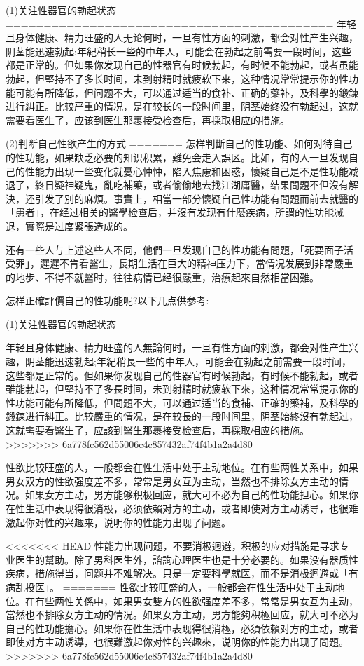 \documentclass[12pt,UTF8]{ctexbook}
\begin{document}
(1)关注性器官的勃起状态
===========================================
年轻且身体健康、精力旺盛的人无论何时，一旦有性方面的刺激，都会对性产生兴趣，阴茎能迅速勃起;年紀稍长一些的中年人，可能会在勃起之前需要一段时间，这些都是正常的。但如果你发现自己的性器官有时候勃起，有时候不能勃起，或者虽能勃起，但堅持不了多长时间，未到射精时就疲软下来，这种情况常常提示你的性功能可能有所降低，但问题不大，可以通过适当的食补、正确的藥补，及科學的鍛鍊进行糾正。比较严重的情况，是在较长的一段时间里，阴茎始终没有勃起过，这就需要看医生了，应该到医生那裹接受检查后，再採取相应的措施。

(2)判断自己性欲产生的方式
=======
怎样判斷自己的性功能、如何对待自己的性功能，如果缺乏必要的知识积累，難免会走入誤区。比如，有的人一旦发现自己的性能力出现一些变化就憂心忡忡，陷入焦慮和困惑，懷疑自己是不是性功能减退了，終日疑神疑鬼，亂吃補藥，或者偷偷地去找江湖庸醫，结果問題不但沒有解決，还引发了別的麻煩。事實上，相當一部分懷疑自己性功能有問題而前去就醫的「患者」，在经过相关的醫學检查后，并沒有发现有什麼疾病，所謂的性功能减退，實際是过度紧張造成的。

还有一些人与上述这些人不同，他們一旦发现自己的性功能有問題，「死要面子活受罪」，遲遲不肯看醫生，長期生活在巨大的精神压力下，當情况发展到非常嚴重的地步、不得不就醫时，往往病情已经很嚴重，治療起來自然相當困難。

怎样正確評價自己的性功能呢?以下几点供参考:

(1)关注性器官的勃起状态

年轻且身体健康、精力旺盛的人無論何时，一旦有性方面的刺激，都会对性产生兴趣，阴茎能迅速勃起;年紀稍長一些的中年人，可能会在勃起之前需要一段时间，这些都是正常的。但如果你发现自己的性器官有时候勃起，有时候不能勃起，或者雖能勃起，但堅持不了多長时间，未到射精时就疲软下來，这种情况常常提示你的性功能可能有所降低，但問題不大，可以通过适当的食補、正確的藥補，及科學的鍛鍊进行糾正。比较嚴重的情况，是在较長的一段时间里，阴茎始終沒有勃起过，这就需要看醫生了，应該到醫生那裹接受检查后，再採取相应的措施。
>>>>>>> 6a778fc562d55006c4c857432af74f4b1a2a4d80

性欲比较旺盛的人，一般都会在性生活中处于主动地位。在有些两性关系中，如果男女双方的性欲强度差不多，常常是男女互为主动，当然也不排除女方主动的情况。如果女方主动，男方能够积极回应，就大可不必为自己的性功能担心。如果你在性生活中表现得很消极，必须依賴对方的主动，或者即使对方主动诱导，也很难激起你对性的兴趣来，说明你的性能力出现了问题。

<<<<<<< HEAD
性能力出现问题，不要消极迥避，积极的应对措施是寻求专业医生的幫助。除了男科医生外，諮詢心理医生也是十分必要的。如果没有器质性疾病，措施得当，问题并不难解决。只是一定要科學就医，而不是消极迴避或「有病乱投医」。
=======
性欲比较旺盛的人，一般都会在性生活中处于主动地位。在有些两性关係中，如果男女雙方的性欲强度差不多，常常是男女互为主动，當然也不排除女方主动的情况。如果女方主动，男方能夠积極回应，就大可不必为自己的性功能擔心。如果你在性生活中表现得很消極，必須依賴对方的主动，或者即使对方主动诱導，也很難激起你对性的兴趣來，说明你的性能力出现了問題。
>>>>>>> 6a778fc562d55006c4c857432af74f4b1a2a4d80
\end{document}
